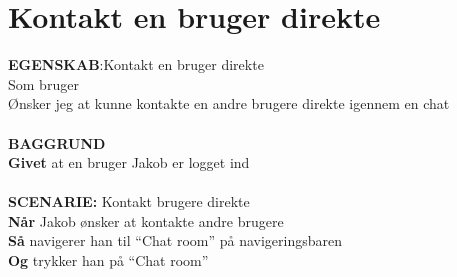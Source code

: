 \section{Kontakt en bruger direkte}
{\color{blue}\textbf{EGENSKAB}:}Kontakt en bruger direkte \\
Som bruger \\
Ønsker jeg at kunne kontakte en andre brugere direkte igennem en chat \\ \\
{\color{blue}\textbf{BAGGRUND}} \\
{\color{blue}\textbf{Givet}} at en bruger Jakob er logget ind \\ \\
{\color{blue}\textbf{SCENARIE:}} Kontakt brugere direkte\\
{\color{blue}\textbf{Når}} Jakob ønsker at kontakte andre brugere \\
{\color{blue}\textbf{Så}} navigerer han til “Chat room” på navigeringsbaren \\
{\color{blue}\textbf{Og}} trykker han på “Chat room”